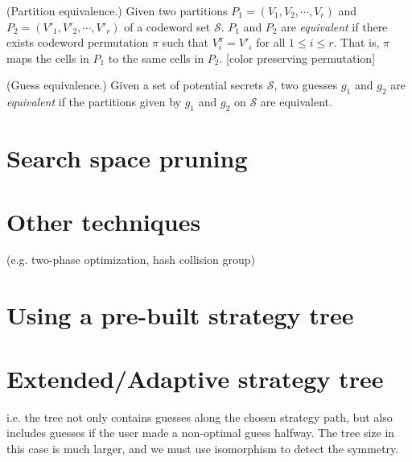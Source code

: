 \begin{definition}
(Partition equivalence.) Given two partitions $P_1 = (V_1, V_2, \cdots, V_r)$ and $P_2 = (V'_1, V'_2, \cdots, V'_r)$ of a codeword set $\mathcal{S}$. $P_1$ and $P_2$ are \emph{equivalent} if there exists codeword permutation $\pi$ such that $V_i^\pi = V'_i$ for all $1 \le i \le r$. That is, $\pi$ maps the cells in $P_1$ to the same cells in $P_2$. [color preserving permutation]
\end{definition}

\begin{definition}
(Guess equivalence.) Given a set of potential secrets $\mathcal{S}$, two guesses $g_1$ and $g_2$ are \emph{equivalent} if the partitions given by $g_1$ and $g_2$ on $\mathcal{S}$ are equivalent.
\end{definition}

\section{Search space pruning}

\section{Other techniques}

(e.g. two-phase optimization, hash collision group)

\section{Using a pre-built strategy tree}

\section{Extended/Adaptive strategy tree}

i.e. the tree not only contains guesses along the chosen strategy path, but also includes guesses if the user made a non-optimal guess halfway. The tree size in this case is much larger, and we must use isomorphism to detect the symmetry.

 
